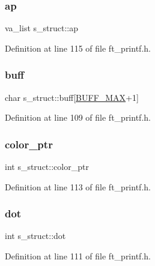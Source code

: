\subsubsection{\texorpdfstring{ap}{ap}}
{\footnotesize\ttfamily va\+\_\+list s\+\_\+struct\+::ap}



Definition at line 115 of file ft\+\_\+printf.\+h.

\mbox{\label{structs__struct_adcd00abc87c5d6f476aea0789f7c93cf}} 
\subsubsection{\texorpdfstring{buff}{buff}}
{\footnotesize\ttfamily char s\+\_\+struct\+::buff\mbox{[}\hyperlink{ft__printf_8h_a2c1c653e45c4962f05cb6341f359707d}{B\+U\+F\+F\+\_\+\+M\+AX}+1\mbox{]}}



Definition at line 109 of file ft\+\_\+printf.\+h.

\mbox{\label{structs__struct_a61adcf84dcc399fc85f607331ed5514f}} 
\subsubsection{\texorpdfstring{color\+\_\+ptr}{color\_ptr}}
{\footnotesize\ttfamily int s\+\_\+struct\+::color\+\_\+ptr}



Definition at line 113 of file ft\+\_\+printf.\+h.

\mbox{\label{structs__struct_a2da26f30dd3dd4c14ff9902f223df69f}} 
\subsubsection{\texorpdfstring{dot}{dot}}
{\footnotesize\ttfamily int s\+\_\+struct\+::dot}



Definition at line 111 of file ft\+\_\+printf.\+h.

\mbox{\label{structs__struct_a99c5b7755906c47bd6c46659fa55436a}} 
